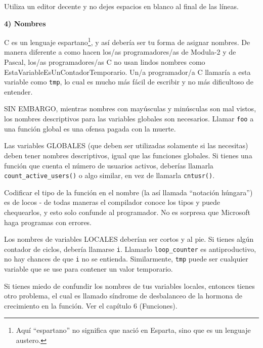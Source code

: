 Utiliza un editor decente y no dejes espacios en blanco al final de las líneas.

\textbf{4) Nombres}

C es un lenguaje espartano\footnote{Aquí ``espartano'' no significa que nació en Esparta, sino que es un lenguaje austero.}, y así debería ser tu forma de asignar nombres. De manera diferente a como hacen los/as programadores/as de Modula-2 y de Pascal, los/as programadores/as C no usan lindos nombres como EstaVariableEsUnContadorTemporario. Un/a programador/a C llamaría a esta variable como \texttt{tmp}, lo cual es mucho más fácil de escribir y no más dificultoso de entender.

SIN EMBARGO, mientras nombres con mayúsculas y minúsculas son mal vistos, los nombres descriptivos para las variables globales son necesarios. Llamar \texttt{foo} a una función global es una ofensa pagada con la muerte.

Las variables GLOBALES (que deben ser utilizadas solamente si las necesitas) deben tener nombres descriptivos, igual que las funciones globales. Si tienes una función que cuenta el número de usuarios activos, deberías llamarla \texttt{count\_active\_users()} o algo similar, en vez de llamarla \texttt{cntusr()}.

Codificar el tipo de la función en el nombre (la así llamada ``notación húngara'') es de locos - de todas maneras el compilador conoce los tipos y puede chequearlos, y esto solo confunde al programador. No es sorpresa que Microsoft haga programas con errores.

Los nombres de variables LOCALES deberían ser cortos y al pie. Si tienes algún contador de ciclos, debería llamarse \texttt{i}. Llamarlo \texttt{loop\_counter} es antiproductivo, no hay chances de que \texttt{i} no se entienda. Similarmente, \texttt{tmp} puede ser cualquier variable que se use para contener un valor temporario.

Si tienes miedo de confundir los nombres de tus variables locales, entonces tienes otro problema, el cual es llamado síndrome de desbalanceo de la hormona de crecimiento en la función. Ver el capítulo 6 (Funciones). 


